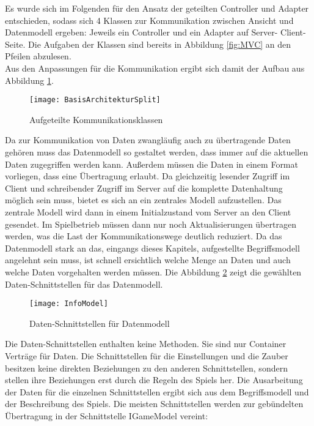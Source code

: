 Es wurde sich im Folgenden für den Ansatz der geteilten Controller und Adapter entschieden, sodass sich 4 Klassen zur Kommunikation zwischen Ansicht und Datenmodell ergeben: Jeweils ein Controller und ein Adapter auf Server- \bzw
Client-Seite. Die Aufgaben der Klassen sind bereits in Abbildung \ref{fig:MVC} an den Pfeilen abzulesen.\\
Aus den Anpassungen für die Kommunikation ergibt sich damit der Aufbau aus Abbildung \ref{fig:ArchitekturSplit}.
\begin{figure}[htp]
	\centering
	\captionsetup{justification=centering}
	\texttt{[image: BasisArchitekturSplit]}
	\caption[ArchitekturSplit]{Aufgeteilte Kommunikationsklassen}
	\label{fig:ArchitekturSplit}
\end{figure}

\noindent Da zur Kommunikation von Daten zwangläufig auch zu übertragende Daten gehören muss das Datenmodell so gestaltet werden, dass immer auf die aktuellen Daten zugegriffen werden kann. Außerdem müssen die Daten in einem Format vorliegen, dass eine Übertragung erlaubt. Da gleichzeitig lesender Zugriff im Client und schreibender Zugriff im Server auf die komplette Datenhaltung möglich sein muss, bietet es sich an ein zentrales Modell aufzustellen. Das zentrale Modell wird dann in einem Initialzustand vom Server an den Client gesendet. Im Spielbetrieb müssen dann nur noch Aktualisierungen übertragen werden, was die Last der Kommunikationswege deutlich reduziert. Da das Datenmodell stark an das, eingangs dieses Kapitels, aufgestellte Begriffsmodell angelehnt sein muss, ist schnell ersichtlich welche Menge an Daten und auch welche Daten vorgehalten werden müssen.
Die Abbildung \ref{fig:InfoModel} zeigt die gewählten Daten-Schnittstellen für das Datenmodell. 
\begin{figure}[htp]
	\centering
	\captionsetup{justification=centering}
	\texttt{[image: InfoModel]}
	\caption[InfoModel]{Daten-Schnittstellen für Datenmodell}
	\label{fig:InfoModel}
\end{figure}
\clearpage
\noindent Die Daten-Schnittstellen enthalten keine Methoden. Sie sind nur Container \bzw Verträge für Daten. Die Schnittstellen für die Einstellungen und die Zauber besitzen keine direkten Beziehungen zu den anderen Schnittstellen, sondern stellen ihre Beziehungen erst durch die Regeln des Spiels her. Die Ausarbeitung der Daten für die einzelnen Schnittstellen ergibt sich aus dem Begriffsmodell und der Beschreibung des Spiels. Die meisten Schnittstellen werden zur gebündelten Übertragung in der Schnittstelle IGameModel vereint:


